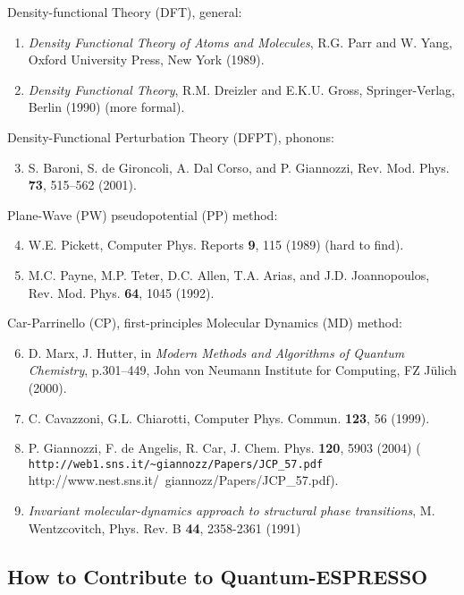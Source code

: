 \documentclass[12pt,a4paper]{article}
\begin{document}
\noindent
Density-functional Theory (DFT), general:
\begin{enumerate}
  \item
    \emph{Density Functional Theory of Atoms and Molecules}, 
    R.G. Parr and W. Yang,
    Oxford University Press, New York (1989).
  \item
    \emph{Density Functional Theory},
    R.M. Dreizler and E.K.U. Gross,
    Springer-Verlag, Berlin (1990) (more formal).
\end{enumerate}
Density-Functional Perturbation Theory (DFPT), phonons:
\begin{enumerate}
  \setcounter{enumi}{2}
  \item
    S. Baroni, S. de Gironcoli, A. Dal Corso, and P. Giannozzi,
    Rev. Mod. Phys. \textbf{73}, 515--562 (2001).
\end{enumerate}
Plane-Wave (PW) pseudopotential (PP) method:
\begin{enumerate}
  \setcounter{enumi}{3}
  \item
    W.E. Pickett,
    Computer Phys. Reports \textbf{9}, 115 (1989)
    (hard to find).
  \item
    M.C. Payne, M.P. Teter, D.C. Allen, T.A. Arias, and
    J.D. Joannopoulos,
    Rev. Mod. Phys. \textbf{64}, 1045 (1992).
\end{enumerate}
Car-Parrinello (CP), first-principles Molecular Dynamics (MD) method:
\begin{enumerate}
  \setcounter{enumi}{5}
  \item
    D. Marx, J. Hutter,
    in \emph{Modern Methods and Algorithms of Quantum Chemistry},
    p.301--449,
    John von Neumann Institute for Computing, FZ J\"ulich (2000).
  \item
    C. Cavazzoni, G.L. Chiarotti,
    Computer Phys. Commun. \textbf{123}, 56 (1999).
  \item
    P. Giannozzi, F. de Angelis, R. Car,
    J. Chem. Phys. \textbf{120}, 5903 (2004)
    (\htmladdnormallink%
     {\texttt{http://web1.sns.it/\~{}giannozz/Papers/JCP\_57.pdf}}%
     {http://www.nest.sns.it/~giannozz/Papers/JCP_57.pdf}).
  \item {\em Invariant molecular-dynamics approach to structural phase
     transitions}, M. Wentzcovitch, Phys. Rev. B {\bf 44}, 2358-2361 (1991)
\end{enumerate}

\subsection{How to Contribute to Quantum-ESPRESSO}
\end{document}
